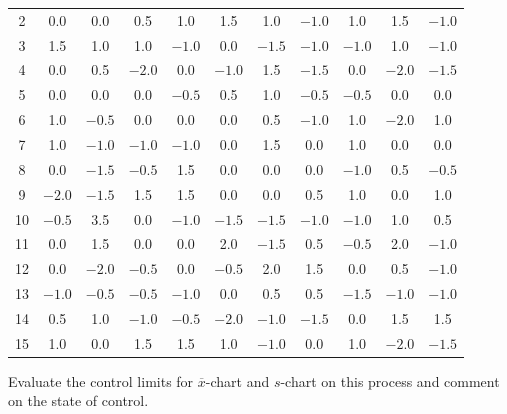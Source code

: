 \documentclass[11pt, a4paper]{article}
\begin{document}
\begin{enumerate}
\begin{table}[h]
\begin{center}
\begin{tabular}{|c||cccccccccc|}
	2 & 0.0 & 0.0 & 0.5 & 1.0 & 1.5 & 1.0 & $-1.0$ & 1.0 & 1.5 & $-1.0$ \\
	
	3 & 1.5 & 1.0 & 1.0 & $-1.0$ & 0.0 & $-1.5$ & $-1.0$ & $-1.0$ & 1.0 & $-1.0$ \\
	
	4 & 0.0 & 0.5 & $-2.0$ & 0.0 & $-1.0$ & 1.5 & $-1.5$ & 0.0 & $-2.0$ & $-1.5$ \\
	
	5 & 0.0 & 0.0 & 0.0 & $-0.5$ & 0.5 & 1.0 & $-0.5$ & $-0.5$ & 0.0 & 0.0 \\
	
	6 & 1.0 & $-0.5$ & 0.0 & 0.0 & 0.0 & 0.5 & $-1.0$ & 1.0 & $-2.0$ & 1.0 \\
	
	7 & 1.0 & $-1.0$ & $-1.0$ & $-1.0$ & 0.0 & 1.5 & 0.0 & 1.0 & 0.0 & 0.0 \\
	
	8 & 0.0 & $-1.5$ & $-0.5$ & 1.5 & 0.0 & 0.0 & 0.0 & $-1.0$ & 0.5 & $-0.5$ \\
	
	9 & $-2.0$ & $-1.5$ & 1.5 & 1.5 & 0.0 & 0.0 & 0.5 & 1.0 & 0.0 & 1.0 \\
	
	10 & $-0.5$ & 3.5 & 0.0 & $-1.0$ & $-1.5$ & $-1.5$ & $-1.0$ & $-1.0$ & 1.0 & 0.5 \\
	
	11 & 0.0 & 1.5 & 0.0 & 0.0 & 2.0 & $-1.5$ & 0.5 & $-0.5$ & 2.0 & $-1.0$ \\
	
	12 & 0.0 & $-2.0$ & $-0.5$ & 0.0 & $-0.5$ & 2.0 & 1.5 & 0.0 & 0.5 & $-1.0$ \\
	
	13 & $-1.0$ & $-0.5$ & $-0.5$ & $-1.0$ & 0.0 & 0.5 & 0.5 & $-1.5$ & $-1.0$ & $-1.0$ \\
	
	14 & 0.5 & 1.0 & $-1.0$ & $-0.5$ & $-2.0$ & $-1.0$ & $-1.5$ & 0.0 & 1.5 & 1.5 \\
	
	15 & 1.0 & 0.0 & 1.5 & 1.5 & 1.0 & $-1.0$ & 0.0 & 1.0 & $-2.0$ & $-1.5$ \\
	
	\hline
	
	
	
	\end{tabular}
	\end{center}
	
	\end{table}
	
	Evaluate the control limits for $\overline{x}$-chart and $s$-chart on this process and comment on the state of control.
	

\end{enumerate}
\end{document}
